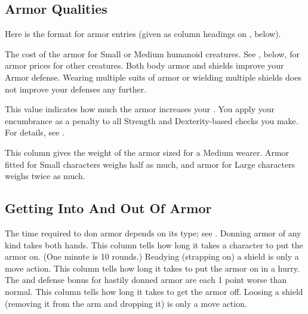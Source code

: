     \subsection{Armor Qualities}
        \par Here is the format for armor entries (given as column headings on , below).

         The cost of the armor for Small or Medium humanoid creatures.
        See , below, for armor prices for other creatures.
         Both body armor and shields improve your Armor defense.
        Wearing multiple suits of armor or wielding multiple shields does not improve your defenses any further.

         This value indicates how much the armor increases your .
        You apply your encumbrance as a penalty to all Strength and Dexterity-based checks you make.
        For details, see .

         This column gives the weight of the armor sized for a Medium wearer. Armor fitted for Small characters weighs half as much, and armor for Large characters weighs twice as much.

    \subsection{Getting Into And Out Of Armor}
        The time required to don armor depends on its type; see . Donning armor of any kind takes both hands.
         This column tells how long it takes a character to put the armor on. (One minute is 10 rounds.) Readying (strapping on) a shield is only a move action.
         This column tells how long it takes to put the armor on in a hurry. The  and defense bonus for hastily donned armor are each 1 point worse than normal.
         This column tells how long it takes to get the armor off. Loosing a shield (removing it from the arm and dropping it) is only a move action.

